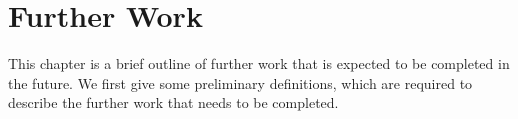 \chapter{Further Work}
\label{cha:further-work}

This chapter is a brief outline of further work that is expected to be
completed in the future.  We first give some preliminary definitions, which
are required to describe the further work that needs to be completed.



